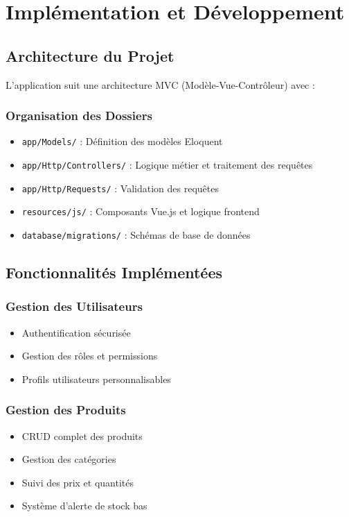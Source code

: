 \documentclass{report}
\begin{document}
\chapter{Implémentation et Développement}

\section{Architecture du Projet}
L'application suit une architecture MVC (Modèle-Vue-Contrôleur) avec :

\subsection{Organisation des Dossiers}
\begin{itemize}
    \item \texttt{app/Models/} : Définition des modèles Eloquent
    \item \texttt{app/Http/Controllers/} : Logique métier et traitement des requêtes
    \item \texttt{app/Http/Requests/} : Validation des requêtes
    \item \texttt{resources/js/} : Composants Vue.js et logique frontend
    \item \texttt{database/migrations/} : Schémas de base de données
\end{itemize}

\section{Fonctionnalités Implémentées}

\subsection{Gestion des Utilisateurs}
\begin{itemize}
    \item Authentification sécurisée
    \item Gestion des rôles et permissions
    \item Profils utilisateurs personnalisables
\end{itemize}

\subsection{Gestion des Produits}
\begin{itemize}
    \item CRUD complet des produits
    \item Gestion des catégories
    \item Suivi des prix et quantités
    \item Système d'alerte de stock bas
\end{itemize}
\end{document}
